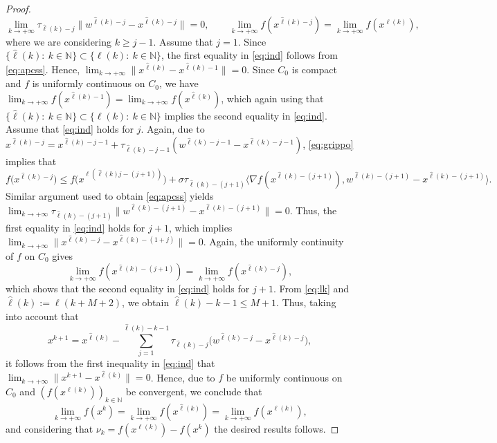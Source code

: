 \begin{proof}
	\begin{equation}\label{eq:ind}
		\lim_{k\to +\infty}  \tau_{{\hat \ell}(k)-j}\|w^{{{\hat \ell}(k)}-j}-x^{{{\hat \ell}(k)}-j}\|=0, \qquad \lim_{k\to +\infty} f(x^{{\hat \ell}(k)-j})= \lim_{k\to +\infty} f(x^{\ell(k)}),
	\end{equation}
	where we are  considering $k\geq j-1$. Assume that $j=1$. Since  $\{{\hat \ell}(k): ~k\in\mathbb{N}\}\subset \{{\ell}(k): ~k\in\mathbb{N}\}$, the first equality in \eqref{eq:ind} follows from \eqref{eq:apcss}. Hence, $\lim_{k\to +\infty} \|x^{{{\hat \ell}(k)}}-x^{{\hat \ell(k)}-1}\|=0$. Since  $C_{0}$ is  compact and  $f$ is uniformly continuous on $C_{0}$, we have $  \lim_{k\to +\infty} f(x^{{\hat \ell}(k)-1})=\lim_{k\to +\infty} f(x^{{\hat \ell(k)}})$, which again using that $\{{\hat \ell}(k): ~k\in\mathbb{N}\}\subset \{{\ell}(k): ~k\in\mathbb{N}\}$ implies the second equality in \eqref{eq:ind}. Assume that \eqref{eq:ind} holds for $j$. Again, due to  $x^{{{\hat \ell}(k)}-j}=x^{{{{\hat \ell}(k)}-j}-1}+ \tau_{{{{\hat \ell}(k)}-j}-1} (w^{{{{\hat \ell}(k)}-j}-1} - x^{{{{\hat \ell}(k)}-j} -1})$,  \eqref{eq:grippo}  implies that
	$$
		f\big(x^{{{\hat \ell}(k)}-j}\big)  \leq f\big(x^{\ell({{{{\hat \ell}(k)}j}-(j+1)})}\big)+ \sigma \tau_{{{{\hat \ell}(k)}}-(j+1)}\big\langle \nabla f(x^{{{{\hat \ell}(k)}}-(j+1)}), w^{{{{\hat \ell}(k)}}-(j+1)} - x^{{{{\hat \ell}(k)}}-(j+1)} \big\rangle.
	$$
	Similar argument used to obtain \eqref{eq:apcss} yields  $\lim_{k\to +\infty} \tau_{{{{\hat \ell}(k)}}-(j+1)}\|w^{{{{\hat \ell}(k)}}-(j+1)}-x^{{{{\hat \ell}(k)}}-(j+1)}\|=0$. Thus,  the first equality in \eqref{eq:ind} holds for $j+1$, which  implies  $\lim_{k\to +\infty} \|x^{{{\hat \ell}(k)}-j}-x^{{{{\hat \ell}(k)}}-(1+j)}\|=0$.  Again, the   uniformly continuity of $f$ on $C_{0}$ gives
	$$
		\lim_{k\to +\infty} f(x^{{\hat \ell}(k)-(j+1)})=\lim_{k\to +\infty} f(x^{{\hat \ell}(k)-j}),
	$$
	which shows that the second equality in \eqref{eq:ind} holds for $j+1$. From  \eqref{eq:lk}  and ${\hat \ell}(k):=\ell(k+M+2)$, we obtain ${\hat \ell}(k)-k-1\leq M+1$. Thus,  taking into account that
	$$
		x^{k+1}=x^{{\hat \ell}(k)}- \sum_{j=1}^{{\hat \ell}(k)-k-1} \tau_{{\hat \ell}(k)-j} \big(w^{{\hat \ell}(k)-j} - x^{{\hat \ell}(k)-j}\big),
	$$
	it follows from the first inequality in \eqref{eq:ind} that $ \lim_{k\to +\infty} \|x^{k+1}-x^{{\hat \ell}(k)}\|=0$. Hence, due to  $f$ be uniformly continuous on $C_{0}$ and $(f(x^{\ell(k)}))_{k\in\mathbb{N}}$  be convergent,  we conclude that
	$$ \lim_{k\to +\infty} f(x^{k})=\lim_{k\to +\infty} f(x^{{\hat \ell}(k)})= \lim_{k\to +\infty} f(x^{\ell(k)}),$$
	and  considering that $\nu_{k}= f(x^{\ell(k)})-f(x^k)$ the desired results follows.
\end{proof}
